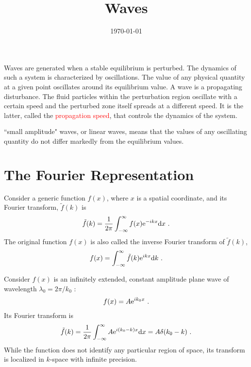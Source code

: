 \documentclass[12pt,a4paper]{article}
\title{Waves}
\author{}
\date{\today}
\newcommand{\dif}{\mathrm{d}}
\begin{document}
\maketitle
Waves are generated when a stable equilibrium is perturbed. The dynamics of such a system is characterized by oscillations. The value of any physical quantity at a given point oscillates around its equilibrium value. A wave is a propagating disturbance. The fluid particles within the perturbation region oscillate with a certain speed and the perturbed zone itself spreads at a different speed. It is the latter, called the \textcolor{red}{propagation speed}, that controls the dynamics of the system. 

``small amplitude" waves, or linear waves, means that the values of any oscillating quantity do not differ markedly from the equilibrium values.

\section{The Fourier Representation}
Consider a generic function $f(x)$, where $x$ is a spatial coordinate, and its Fourier transform, $\tilde{f}(k)$ is
\begin{equation}
\tilde{f}(k) = \frac{1}{2\pi} \int_{-\infty}^{\infty} f(x) {\rm e}^{-ikx} \dif x ~.
\end{equation}
The original function $f(x)$ is also called the inverse Fourier transform of $\tilde{f}(k)$,
\begin{equation}
f(x) = \int_{-\infty}^{\infty} \tilde{f}(k){\rm e}^{ikx} \dif k ~.
\end{equation}

Consider $f(x)$ is an infinitely extended, constant amplitude plane wave of wavelength $\lambda_0 = 2\pi/k_0$ :
\begin{equation*}
f(x) = A {\rm e}^{ik_0 x} ~.
\end{equation*}
Its Fourier transform is
\begin{equation*}
\tilde{f}(k) = \frac{1}{2\pi} \int_{-\infty}^{\infty} A {\rm e}^{i(k_0-k) x} \dif x = A \delta(k_0 -k) ~.
\end{equation*}
While the function does not identify any particular region of space, its transform is localized in $k$-space with infinite precision.
\end{document}
